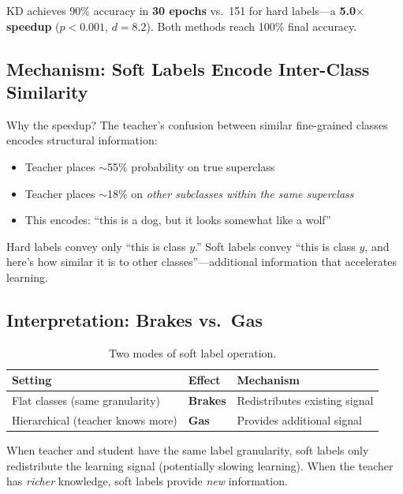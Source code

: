 \documentclass{article}
\begin{document}
KD achieves 90\% accuracy in \textbf{30 epochs} vs.\ 151 for hard labels---a \textbf{5.0$\times$ speedup} ($p < 0.001$, $d = 8.2$). Both methods reach 100\% final accuracy.

\subsection{Mechanism: Soft Labels Encode Inter-Class Similarity}

Why the speedup? The teacher's confusion between similar fine-grained classes encodes structural information:
\begin{itemize}
    \item Teacher places $\sim$55\% probability on true superclass
    \item Teacher places $\sim$18\% on \textit{other subclasses within the same superclass}
    \item This encodes: ``this is a dog, but it looks somewhat like a wolf''
\end{itemize}

Hard labels convey only ``this is class $y$.'' Soft labels convey ``this is class $y$, and here's how similar it is to other classes''---additional information that accelerates learning.

\subsection{Interpretation: Brakes vs.\ Gas}

\begin{table}[h]
\centering
\caption{Two modes of soft label operation.}
\label{tab:brakesgas}
\begin{tabular}{@{}lll@{}}
\toprule
Setting & Effect & Mechanism \\
\midrule
Flat classes (same granularity) & \textbf{Brakes} & Redistributes existing signal \\
Hierarchical (teacher knows more) & \textbf{Gas} & Provides additional signal \\
\bottomrule
\end{tabular}
\end{table}

When teacher and student have the same label granularity, soft labels only redistribute the learning signal (potentially slowing learning). When the teacher has \textit{richer} knowledge, soft labels provide \textit{new} information.

\end{document}
